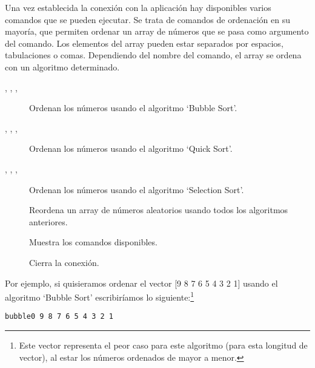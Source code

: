 Una vez establecida la conexión con la aplicación hay disponibles varios comandos que se pueden ejecutar. Se trata de comandos de ordenación en su mayoría, que permiten ordenar un array de números que se pasa como argumento del comando. Los elementos del array pueden estar separados por espacios, tabulaciones o comas. Dependiendo del nombre del comando, el array se ordena con un algoritmo determinado.
\begin{description}
	\item[, , , ] Ordenan los números usando el algoritmo `Bubble Sort'.
	\item[, , , ] Ordenan los números usando el algoritmo `Quick Sort'.
	\item[, , , ] Ordenan los números usando el algoritmo `Selection Sort'.
	\item[] Reordena un array de números aleatorios usando todos los algoritmos anteriores.
	\item[] Muestra los comandos disponibles.
	\item[] Cierra la conexión.
\end{description}

Por ejemplo, si quisieramos ordenar el vector [9 8 7 6 5 4 3 2 1] usando el algoritmo `Bubble Sort' escribiríamos lo siguiente:\footnote{Este vector representa el peor caso para este algoritmo (para esta longitud de vector), al estar los números ordenados de mayor a menor.}
\begin{lstlisting}
bubble0 9 8 7 6 5 4 3 2 1
\end{lstlisting}

